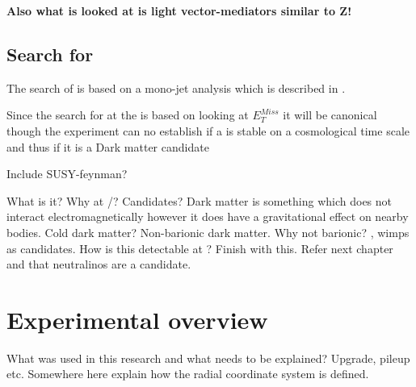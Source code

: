 \textbf{Also what is looked at is light vector-mediators similar to Z!}

\subsection{Search for \abbrWIMPS}
The search of \abbrWIMPS is based on a mono-jet analysis which is described in . 

Since the search for \abbrWIMPS at the \abbrLHC is based on looking at $E_T^{Miss}$ it will be canonical though the experiment can no establish if a \abbrWIMP is stable on a cosmological time scale and thus if it is a Dark matter candidate \citep{CERN-PH-EP-2012-210}

Include SUSY-feynman?

What is it? Why at \abbrCERN/\abbrATLAS? Candidates?
Dark matter is something which does not interact electromagnetically however it does have a gravitational effect on nearby bodies.
Cold dark matter?
Non-barionic dark matter. Why not barionic?
\abbrWIMPS, wimps as candidates.
How is this detectable at \abbrATLAS? Finish with this. Refer next chapter and that neutralinos are a candidate.

\newpage
\section{Experimental overview}\label{sec:experiment}
What was used in this research and what needs to be explained? Upgrade, pileup etc.
Somewhere here explain how the radial coordinate system is defined.
